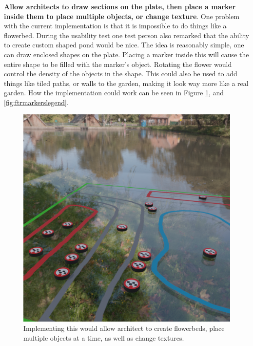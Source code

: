 \textbf{Allow architects to draw sections on the plate, then place a marker inside them to place multiple objects, or change texture}. One problem with the current implementation is that it is impossible to do things like a flowerbed. During the usability test one test person also remarked that the ability to create custom shaped pond would be nice. The idea is reasonably simple, one can draw enclosed shapes on the plate. Placing a marker inside this will cause the entire shape to be filled with the marker's object. Rotating the flower would control the density of the objects in the shape. This could also be used to add things like tiled paths, or walls to the garden, making it look way more like a real garden. How the implementation could work can be seen in Figure \ref{fig:ftemarkers}, and \ref{fig:ftrmarkerslegend}.
\begin{figure}[H]
	\centering
	\begin{minipage}[b]{0.49\textwidth}
		\includegraphics[width=1.0\linewidth]{figure/Evaluation/futuremarkers.png}
		\caption{Implementing this would allow architect to create flowerbeds, place multiple objects at a time, as well as change textures.}
		\label{fig:ftemarkers}
	\end{minipage}
	\hfill
	\begin{minipage}[b]{0.49\textwidth}

\end{minipage}
\end{figure}
